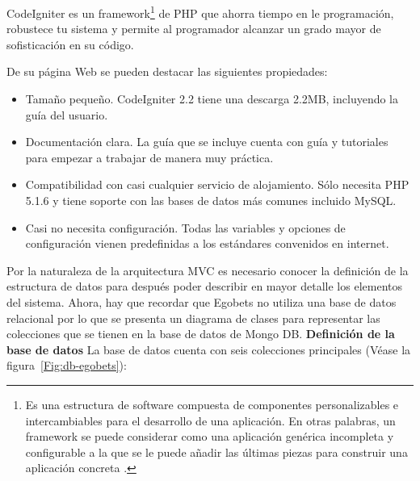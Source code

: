 CodeIgniter es un framework\footnote{Es una estructura de software compuesta de componentes personalizables e intercambiables para el desarrollo de una aplicación. En otras palabras, un framework se puede considerar como una aplicación genérica incompleta y configurable a la que se le puede añadir las últimas piezas para construir una aplicación concreta \cite{upton2007codeigniter}.} de PHP que ahorra tiempo en le programación, robustece tu sistema y permite al programador alcanzar un grado mayor de sofisticación en su código.

	De su página Web \cite{codeigniterWeb} se pueden destacar las siguientes propiedades:
	\begin{itemize}
		\item Tamaño pequeño. CodeIgniter 2.2 tiene una descarga 2.2MB, incluyendo la guía del usuario.
		\item Documentación clara. La guía que se incluye cuenta con guía y tutoriales para empezar a trabajar de manera muy práctica.
		\item Compatibilidad con casi cualquier servicio de alojamiento. Sólo necesita PHP 5.1.6 y tiene soporte con las bases de datos más comunes incluido MySQL.

		\item Casi no necesita configuración. Todas las variables y opciones de configuración vienen predefinidas a los estándares convenidos en internet.

	\end{itemize}


	Por la naturaleza de la arquitectura MVC es necesario conocer la definición de la estructura de datos para después poder describir en mayor detalle los elementos del sistema. Ahora, hay que recordar que Egobets no utiliza una base de datos relacional por lo que se presenta un diagrama de clases para representar las colecciones que se tienen en la base de datos de Mongo DB.
	\textbf{Definición de la base de datos}
	La base de datos cuenta con seis colecciones principales (Véase la figura~\ref{Fig:db-egobets}):

